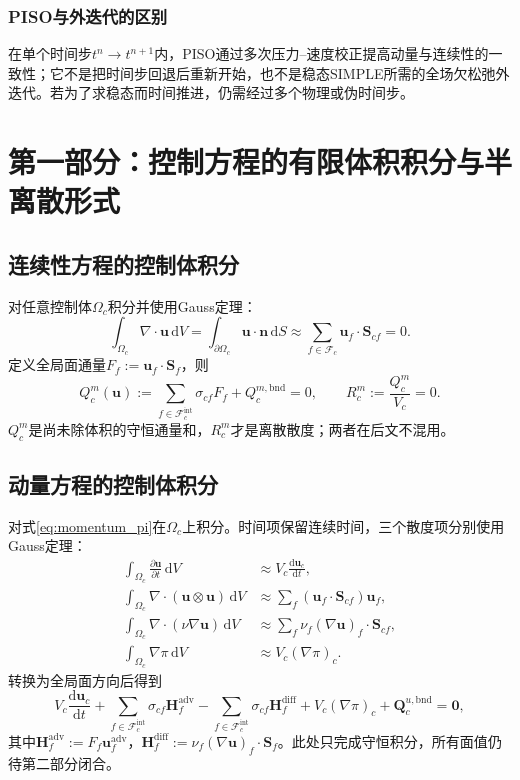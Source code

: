 \documentclass[UTF8,12pt,a4paper]{ctexart}
\numberwithin{equation}{section}
\begin{document}
\subsubsection*{PISO与外迭代的区别}
在单个时间步$t^n\to t^{n+1}$内，PISO通过多次压力--速度校正提高动量与连续性的一致性；它不是把时间步回退后重新开始，也不是稳态SIMPLE所需的全场欠松弛外迭代。若为了求稳态而时间推进，仍需经过多个物理或伪时间步。

\section{第一部分：控制方程的有限体积积分与半离散形式}
\subsection{连续性方程的控制体积分}
对任意控制体$\Omega_c$积分并使用Gauss定理：
\begin{equation}
  \int_{\Omega_c}\nabla\cdot\bm u\,\mathrm dV
  =\int_{\partial\Omega_c}\bm u\cdot\bm n\,\mathrm dS
  \approx\sum_{f\in\mathcal F_c}\bm u_f\cdot\bm S_{cf}=0.
\end{equation}
定义全局面通量$F_f:=\bm u_f\cdot\bm S_f$，则
\begin{equation}
  \boxed{Q_c^m(\bm u):=
  \sum_{f\in\mathcal F_c^{\mathrm{int}}}\sigma_{cf}F_f
  +Q_c^{m,\mathrm{bnd}}=0,
  \qquad
  R_c^m:=\frac{Q_c^m}{V_c}=0.}
  \label{eq:piso_semidiscrete_continuity}
\end{equation}
$Q_c^m$是尚未除体积的守恒通量和，$R_c^m$才是离散散度；两者在后文不混用。

\subsection{动量方程的控制体积分}
对式\eqref{eq:momentum_pi}在$\Omega_c$上积分。时间项保留连续时间，三个散度项分别使用Gauss定理：
\begin{align}
  \int_{\Omega_c}\frac{\partial\bm u}{\partial t}\,\mathrm dV
  &\approx V_c\frac{\mathrm d\bm u_c}{\mathrm dt},\\
  \int_{\Omega_c}\nabla\cdot(\bm u\otimes\bm u)\,\mathrm dV
  &\approx\sum_f(\bm u_f\cdot\bm S_{cf})\bm u_f,\\
  \int_{\Omega_c}\nabla\cdot(\nu\nabla\bm u)\,\mathrm dV
  &\approx\sum_f\nu_f(\nabla\bm u)_f\cdot\bm S_{cf},\\
  \int_{\Omega_c}\nabla\pi\,\mathrm dV
  &\approx V_c(\nabla\pi)_c.
\end{align}
转换为全局面方向后得到
\begin{equation}
  \boxed{V_c\frac{\mathrm d\bm u_c}{\mathrm dt}
  +\sum_{f\in\mathcal F_c^{\mathrm{int}}}\sigma_{cf}\bm H_f^{\mathrm{adv}}
  -\sum_{f\in\mathcal F_c^{\mathrm{int}}}\sigma_{cf}\bm H_f^{\mathrm{diff}}
  +V_c(\nabla\pi)_c+\bm Q_c^{u,\mathrm{bnd}}=\bm0,}
  \label{eq:piso_momentum_semidiscrete}
\end{equation}
其中$\bm H_f^{\mathrm{adv}}:=F_f\bm u_f^{\mathrm{adv}}$，$\bm H_f^{\mathrm{diff}}:=\nu_f(\nabla\bm u)_f\cdot\bm S_f$。此处只完成守恒积分，所有面值仍待第二部分闭合。
\end{document}

